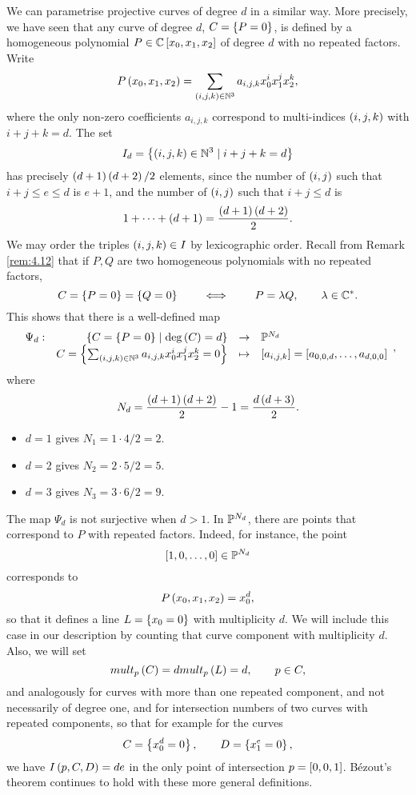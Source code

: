 We can parametrise projective curves of degree $ d $ in a similar way. More precisely, we have seen that any curve of degree $ d $, $ C = \cb{P = 0} $, is defined by a homogeneous polynomial $ P \in \C\sb{x_0, x_1, x_2} $ of degree $ d $ with no repeated factors. Write
$$ P\rb{x_0, x_1, x_2} = \sum_{\rb{i, j, k} \in \N^3} a_{i, j, k}x_0^ix_1^jx_2^k, $$
where the only non-zero coefficients $ a_{i, j, k} $ correspond to multi-indices $ \rb{i, j, k} $ with $ i + j + k = d $. The set
$$ I_d = \cb{\rb{i, j, k} \in \N^3 \mid i + j + k = d} $$
has precisely $ \rb{d + 1}\rb{d + 2} / 2 $ elements, since the number of $ \rb{i, j} $ such that $ i + j \le e \le d $ is $ e + 1 $, and the number of $ \rb{i, j} $ such that $ i + j \le d $ is
$$ 1 + \dots + \rb{d + 1} = \dfrac{\rb{d + 1}\rb{d + 2}}{2}. $$
We may order the triples $ \rb{i, j, k} \in I $ by lexicographic order. Recall from Remark \ref{rem:4.12} that if $ P, Q $ are two homogeneous polynomials with no repeated factors,
$$ C = \cb{P = 0} = \cb{Q = 0} \qquad \iff \qquad P = \lambda Q, \qquad \lambda \in \C^*. $$
This shows that there is a well-defined map
$$ \function[\Psi_d]{\cb{C = \cb{P = 0} \mid \deg\rb{C} = d}}{\P^{N_d}}{C = \cb{\sum_{\rb{i, j, k} \in \N^3} a_{i, j, k}x_0^ix_1^jx_2^k = 0}}{\sb{a_{i, j, k}} = \sb{a_{0, 0, d}, \dots, a_{d, 0, 0}}}, $$
where
$$ N_d = \dfrac{\rb{d + 1}\rb{d + 2}}{2} - 1 = \dfrac{d\rb{d + 3}}{2}. $$

\begin{example*}
\hfill
\begin{itemize}
\item $ d = 1 $ gives $ N_1 = 1 \cdot 4 / 2 = 2 $.
\item $ d = 2 $ gives $ N_2 = 2 \cdot 5 / 2 = 5 $.
\item $ d = 3 $ gives $ N_3 = 3 \cdot 6 / 2 = 9 $.
\end{itemize}
\end{example*}

\begin{remark}
The map $ \Psi_d $ is not surjective when $ d > 1 $. In $ \P^{N_d} $, there are points that correspond to $ P $ with repeated factors. Indeed, for instance, the point
$$ \sb{1, 0, \dots, 0} \in \P^{N_d} $$
corresponds to
$$ P\rb{x_0, x_1, x_2} = x_0^d, $$
so that it defines a line $ L = \cb{x_0 = 0} $ with multiplicity $ d $. We will include this case in our description by counting that curve component with multiplicity $ d $. Also, we will set
$$ mult_p\rb{C} = dmult_p\rb{L} = d, \qquad p \in C, $$
and analogously for curves with more than one repeated component, and not necessarily of degree one, and for intersection numbers of two curves with repeated components, so that for example for the curves
$$ C = \cb{x_0^d = 0}, \qquad D = \cb{x_1^e = 0}, $$
we have $ I\rb{p, C, D} = de $ in the only point of intersection $ p = \sb{0, 0, 1} $. B\'ezout's theorem continues to hold with these more general definitions.
\end{remark}

